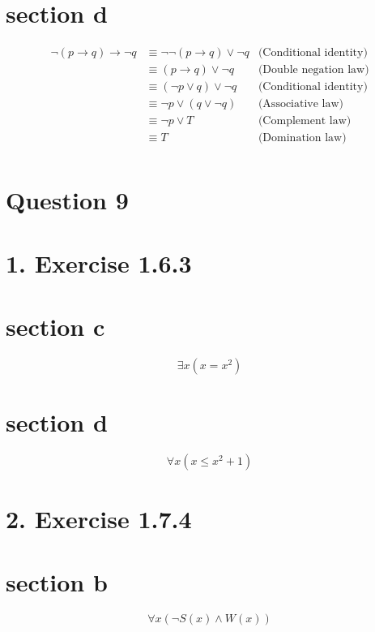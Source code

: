 \documentclass[10pt]{article}
\begin{document}
\section*{section d}
$$
\begin{aligned}
\neg(p \rightarrow q) \rightarrow \neg q & \equiv \neg \neg(p \rightarrow q) \vee \neg q & \text {(Conditional identity)}\\
& \equiv(p \rightarrow q) \vee \neg q                                                    & \text {(Double negation law)}\\
& \equiv(\neg p \vee q) \vee \neg q                                                      & \text {(Conditional identity)}\\
& \equiv \neg p \vee(q \vee \neg q)                                                      & \text {(Associative law)}\\
& \equiv \neg p \vee T                                                                   & \text {(Complement law)}\\
& \equiv T                                                                               & \text {(Domination law)}\\
\end{aligned}
$$

\pagebreak
\section*{Question 9}
\section*{1. Exercise 1.6.3}
\section*{section c}

$$
\exists x\left(x=x^{2}\right)
$$

\section*{section d}

$$
\forall x\left(x \leq x^{2}+1\right)
$$

\section*{2. Exercise 1.7.4}
\section*{section b}
$$
\forall x(\neg S(x) \wedge W(x))
$$
\end{document}
